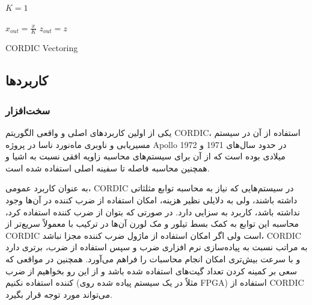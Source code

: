 \documentclass[12pt,titlepage,a4page , tikz , multi,table , svgnames,xcdraw]{article}
\begin{document}
\begin{latin}
\begin{algorithm}[H]
\DontPrintSemicolon
{}

\SetAlgoLined
{}

  $K = 1$\;
  
  $x_{out} = \frac{x}{K}$\;
  $z_{out} = z$\;
 
 \caption{CORDIC Vectoring}
\end{algorithm}
\end{latin}

\newpage

\subsection{کاربردها}

\subsubsection{سخت‌افزار}

یکی از اولین کاربردهای اصلی و واقعی الگوریتم CORDIC، استفاده از آن در سیستم مسیریابی و ناوبری ماه‌نورد ناسا در پروژه Apollo در حدود سال‌های 1971 و 1972 میلادی بوده است که از آن برای سیستم‌های محاسبه زاویه افقی نسبت به اشیا و همچنین محاسبه فاصله تا سفینه اصلی استفاده شده است. \cite{lunar}

به عنوان کاربرد عمومی، CORDIC در سیستم‌هایی که نیاز به محاسبه توابع مثلثاتی داشته باشند، ولی به دلایلی نظیر هزینه، امکان استفاده از ضرب کننده در آن‌ها وجود نداشته باشد، کاربرد به سزایی دارد. در صورتی که بتوان از ضرب کننده استفاده کرد، محاسبه این توابع به کمک بسط تیلور و مک لورن آن‌ها در ترکیب با  معمولاً سریع‌تر از CORDIC است ولی اگر امکان استفاده از ماژول ضرب کننده مجزا نباشد، CORDIC به مراتب نسبت به پیاده‌سازی نرم افزاری ضرب و سپس استفاده از ضرب، برتری دارد و با سرعت بیش‌تری امکان انجام محاسبات را فراهم می‌آورد. همچنین در مواقعی که سعی بر کمینه کردن تعداد گیت‌های استفاده شده باشد و از این رو بخواهیم از ضرب کننده استفاده نکنیم (مثلاً در یک سیستم پیاده شده روی FPGA) استفاده از CORDIC می‌تواند مورد توجه قرار بگیرد.
\end{document}
